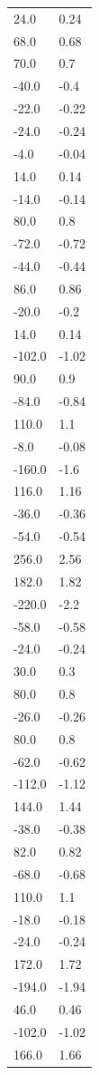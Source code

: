 \begin{longtable}{ll}
24.0 & 0.24 \\
68.0 & 0.68 \\
70.0 & 0.7 \\
-40.0 & -0.4 \\
-22.0 & -0.22 \\
-24.0 & -0.24 \\
-4.0 & -0.04 \\
14.0 & 0.14 \\
-14.0 & -0.14 \\
80.0 & 0.8 \\
-72.0 & -0.72 \\
-44.0 & -0.44 \\
86.0 & 0.86 \\
-20.0 & -0.2 \\
14.0 & 0.14 \\
-102.0 & -1.02 \\
90.0 & 0.9 \\
-84.0 & -0.84 \\
110.0 & 1.1 \\
-8.0 & -0.08 \\
-160.0 & -1.6 \\
116.0 & 1.16 \\
-36.0 & -0.36 \\
-54.0 & -0.54 \\
256.0 & 2.56 \\
182.0 & 1.82 \\
-220.0 & -2.2 \\
-58.0 & -0.58 \\
-24.0 & -0.24 \\
30.0 & 0.3 \\
80.0 & 0.8 \\
-26.0 & -0.26 \\
80.0 & 0.8 \\
-62.0 & -0.62 \\
-112.0 & -1.12 \\
144.0 & 1.44 \\
-38.0 & -0.38 \\
82.0 & 0.82 \\
-68.0 & -0.68 \\
110.0 & 1.1 \\
-18.0 & -0.18 \\
-24.0 & -0.24 \\
172.0 & 1.72 \\
-194.0 & -1.94 \\
46.0 & 0.46 \\
-102.0 & -1.02 \\
166.0 & 1.66 \\

\end{longtable}
